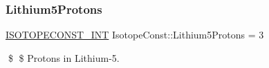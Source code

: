 \subsubsection{\texorpdfstring{Lithium5\+Protons}{Lithium5Protons}}
{\footnotesize\ttfamily \mbox{\hyperlink{group___isotope_const-_macros_ga5f18360b3e99483a35c32d789e62621c}{I\+S\+O\+T\+O\+P\+E\+C\+O\+N\+S\+T\+\_\+\+I\+NT}} Isotope\+Const\+::\+Lithium5\+Protons = 3}

\$ \$ Protons in Lithium-\/5. 